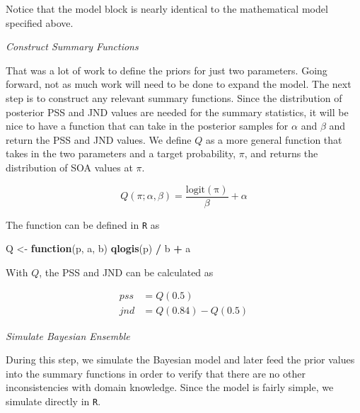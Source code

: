 \documentclass[11pt, oneside, openany]{scrbook}
\newenvironment{Shaded}{\begin{snugshade}}{\end{snugshade}}
\newcommand{\ControlFlowTok}[1]{\textcolor[rgb]{0.13,0.29,0.53}{\textbf{#1}}}
\newcommand{\KeywordTok}[1]{\textcolor[rgb]{0.13,0.29,0.53}{\textbf{#1}}}
\newcommand{\NormalTok}[1]{#1}
\newcommand{\OperatorTok}[1]{\textcolor[rgb]{0.81,0.36,0.00}{\textbf{#1}}}
\newcommand{\StringTok}[1]{\textcolor[rgb]{0.31,0.60,0.02}{#1}}
\begin{document}
Notice that the model block is nearly identical to the mathematical model specified above.

\emph{Construct Summary Functions}

That was a lot of work to define the priors for just two parameters. Going forward, not as much work will need to be done to expand the model. The next step is to construct any relevant summary functions. Since the distribution of posterior PSS and JND values are needed for the summary statistics, it will be nice to have a function that can take in the posterior samples for \(\alpha\) and \(\beta\) and return the PSS and JND values. We define \(Q\) as a more general function that takes in the two parameters and a target probability, \(\pi\), and returns the distribution of SOA values at \(\pi\).

\begin{equation}
  Q(\pi; \alpha, \beta) = \frac{\mathrm{logit(\pi)}}{\beta} + \alpha
  \label{eq:summfun1}
\end{equation}

The function can be defined in \texttt{R} as

\begin{Shaded}
\begin{Highlighting}[]
\NormalTok{Q <-}\StringTok{ }\ControlFlowTok{function}\NormalTok{(p, a, b) }\KeywordTok{qlogis}\NormalTok{(p) }\OperatorTok{/}\StringTok{ }\NormalTok{b }\OperatorTok{+}\StringTok{ }\NormalTok{a}
\end{Highlighting}
\end{Shaded}

With \(Q\), the PSS and JND can be calculated as

\begin{align}
  pss &= Q(0.5) \\
  jnd &= Q(0.84) - Q(0.5)
\end{align}

\emph{Simulate Bayesian Ensemble}

During this step, we simulate the Bayesian model and later feed the prior values into the summary functions in order to verify that there are no other inconsistencies with domain knowledge. Since the model is fairly simple, we simulate directly in \texttt{R}.
\end{document}

